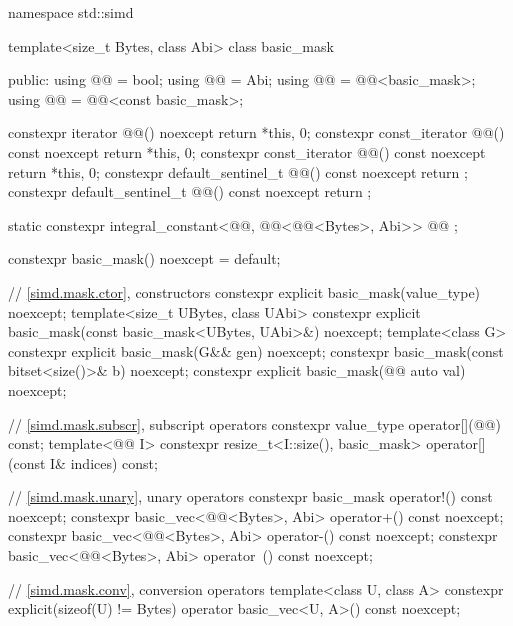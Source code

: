 \begin{codeblock}
namespace std::simd {
  template<size_t Bytes, class Abi> class basic_mask {
  public:
    using @@ = bool;
    using @@ = Abi;
    using @@ = @@<basic_mask>;
    using @@ = @@<const basic_mask>;

    constexpr iterator @@() noexcept { return {*this, 0}; }
    constexpr const_iterator @@() const noexcept { return {*this, 0}; }
    constexpr const_iterator @@() const noexcept { return {*this, 0}; }
    constexpr default_sentinel_t @@() const noexcept { return {}; }
    constexpr default_sentinel_t @@() const noexcept { return {}; }

    static constexpr integral_constant<@@, @@<@@<Bytes>, Abi>>
      @@ {};

    constexpr basic_mask() noexcept = default;

    // \ref{simd.mask.ctor},  constructors
    constexpr explicit basic_mask(value_type) noexcept;
    template<size_t UBytes, class UAbi>
      constexpr explicit basic_mask(const basic_mask<UBytes, UAbi>&) noexcept;
    template<class G>
      constexpr explicit basic_mask(G&& gen) noexcept;
    constexpr basic_mask(const bitset<size()>& b) noexcept;
    constexpr explicit basic_mask(@@ auto val) noexcept;

    // \ref{simd.mask.subscr},  subscript operators
    constexpr value_type operator[](@@) const;
    template<@@ I>
      constexpr resize_t<I::size(), basic_mask> operator[](const I& indices) const;

    // \ref{simd.mask.unary},  unary operators
    constexpr basic_mask operator!() const noexcept;
    constexpr basic_vec<@@<Bytes>, Abi> operator+() const noexcept;
    constexpr basic_vec<@@<Bytes>, Abi> operator-() const noexcept;
    constexpr basic_vec<@@<Bytes>, Abi> operator~() const noexcept;

    // \ref{simd.mask.conv},  conversion operators
    template<class U, class A>
      constexpr explicit(sizeof(U) != Bytes) operator basic_vec<U, A>() const noexcept;

}}
\end{codeblock}
